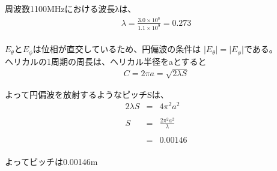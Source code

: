 \documentclass[dvipdfmx,autodetect-engine,titlepage]{jsarticle}
\begin{document}
周波数1100MHzにおける波長λは、
\begin{eqnarray*}
  \lambda  = \frac{3.0 \times 10^8}{1.1 \times 10^9} = 0.273
\end{eqnarray*}
　\\
\begin{math}
  E_{\theta }とE_{\phi }
\end{math}は位相が直交しているため、円偏波の条件は
\begin{math}
  | E_{\theta } \vert = | E_{\phi }\vert 
\end{math}である。\\

ヘリカルの1周期の周長は、ヘリカル半径をaとすると
\begin{eqnarray*}
  C = 2\pi a = \sqrt{2\lambda S} 
\end{eqnarray*}

よって円偏波を放射するようなピッチSは、
\begin{eqnarray*}
  2\lambda S &=& 4\pi^2 a^2 \\\\
  S &=& \frac{2\pi^2 a^2}{\lambda } \\\\
  &=& 0.00146
\end{eqnarray*}
　\\
よってピッチは0.00146m
\end{document}

